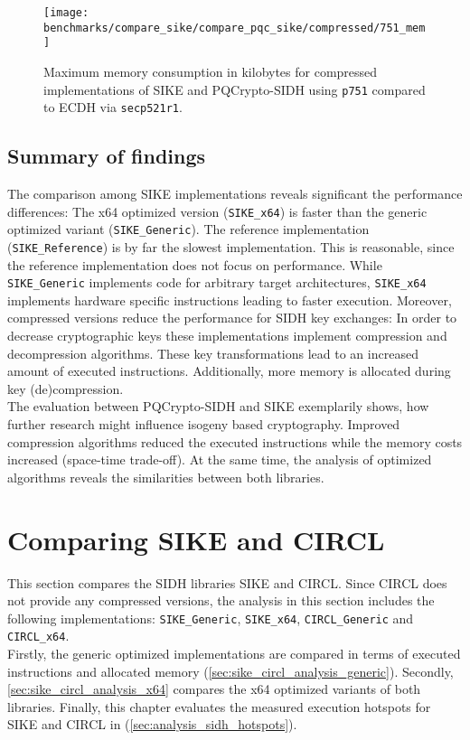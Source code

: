 \begin{figure}[H]
  \centering
  \texttt{[image: benchmarks/compare\_sike/compare\_pqc\_sike/compressed/751\_mem]}
  \caption[Maximum memory consumption in kilobytes for compressed implementations of \gls{SIKE} and \gls{PQCrypto-SIDH} using \texttt{p751}]
  {Maximum memory consumption in kilobytes for compressed implementations of \gls{SIKE} and \gls{PQCrypto-SIDH} using \texttt{p751} compared to \gls{ECDH} via \texttt{secp521r1}.}
  \label{fig:results_sike_pqc_comp_751_mem}
\end{figure}

\subsection{Summary of findings}
The comparison among \gls{SIKE} implementations reveals significant the performance differences: The x64 optimized version (\texttt{SIKE\_x64}) is faster than the generic optimized variant (\texttt{SIKE\_Generic}). The reference implementation (\texttt{SIKE\_Reference}) is by far the slowest implementation. This is reasonable, since the reference implementation does not focus on performance. While \texttt{SIKE\_Generic} implements code for arbitrary target architectures, \texttt{SIKE\_x64} implements hardware specific instructions leading to faster execution.  Moreover, compressed versions reduce the performance for \gls{SIDH} key exchanges: In order to decrease cryptographic keys these implementations implement compression and decompression algorithms. These key transformations lead to an increased amount of executed instructions. Additionally, more memory is allocated during key (de)compression.\\
The evaluation between \gls{PQCrypto-SIDH} and \gls{SIKE} exemplarily shows, how further research might influence isogeny based cryptography. Improved compression algorithms reduced the executed instructions while the memory costs increased (space-time trade-off). At the same time, the analysis of optimized algorithms reveals the similarities between both libraries.


\section{Comparing \gls{SIKE} and \gls{CIRCL}} \label{sec:sike_vs_circl}

This section compares the SIDH libraries \gls{SIKE} and \gls{CIRCL}. Since \gls{CIRCL} does not provide any compressed versions, the analysis in this section includes the following implementations: \texttt{SIKE\_Generic}, \texttt{SIKE\_x64}, \texttt{CIRCL\_Generic} and \texttt{CIRCL\_x64}.\\
Firstly, the generic optimized implementations are compared in terms of executed instructions and allocated memory (\autoref{sec:sike_circl_analysis_generic}). Secondly, \autoref{sec:sike_circl_analysis_x64} compares the x64 optimized variants of both libraries. Finally, this chapter evaluates the measured execution hotspots for \gls{SIKE} and \gls{CIRCL} in (\autoref{sec:analysis_sidh_hotspots}). 

